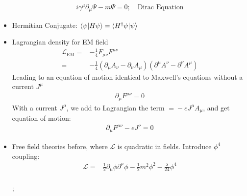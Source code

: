 \begin{itemize}
\begin{equation}
\begin{split}
            i\gamma^\mu\partial_\mu\Psi-m\Psi=0; \quad\text{Dirac Equation}
        \end{split}\end{equation}
        \item Hermitian Conjugate: $\braket{\psi|H\psi}=\braket{H^\dagger\psi|\psi}$ \cite{wells}
    \item Lagrangian density for EM field \cite{wells}
        \begin{equation}\begin{split}
        \mathcal{L}_\text{EM}=&-\frac{1}{4}F_{\mu\nu}F^{\mu\nu} \\
        =&-\frac{1}{4}(\partial_\mu A_\nu-\partial_\nu A_\mu)(\partial^\mu A^\nu-\partial^\nu A^\mu)
        \end{split}\end{equation}
        Leading to an equation of motion identical to Maxwell's equations without a current $J^\mu$
        \begin{equation}\begin{split}
        \partial_\mu F^{\mu\nu}=0
        \end{split}\end{equation}
        With a current $J^\mu$, we add to Lagrangian the term $\mathcal=-eJ^\mu A_\mu$, and get equation of motion:
        \begin{equation}\begin{split}
        \partial_\mu F^{\mu\nu}-eJ^\nu=0
        \end{split}\end{equation}
    \item Free field theories before, where $\mathcal{L}$ is quadratic in fields. Introduce $\phi^4$ coupling: \cite{wells}
        \begin{equation}\begin{split}
        \mathcal{L}=&\frac{1}{2}\partial_\mu\phi\partial^\mu\phi-\frac{1}{2}m^2\phi^2-\frac{\lambda}{24}\phi^4 \\
        \end{split}\end{equation}
            \begin{center}
            \begin{turn}{45}
            ;
            \end{turn}
            \end{center}
\end{itemize}

